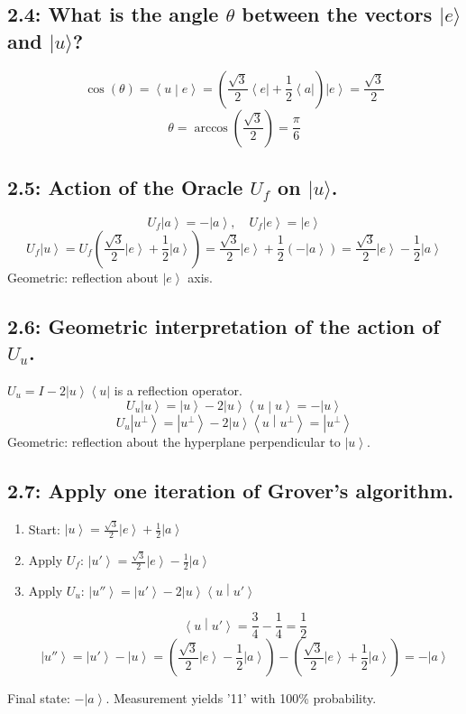 \documentclass[11pt]{article}
\newcommand{\ket}[1]{\left|{#1}\right\rangle}
\newcommand{\bra}[1]{\left\langle{#1}\right|}
\newcommand{\braket}[2]{\left\langle{#1}\middle|{#2}\right\rangle}
\begin{document}
\subsection*{2.4: What is the angle $\theta$ between the vectors $|e\rangle$ and $|u\rangle$?}
$$
\cos(\theta) = \braket{u}{e} = \left(\frac{\sqrt{3}}{2}\bra{e} + \frac{1}{2}\bra{a}\right) \ket{e} = \frac{\sqrt{3}}{2}
$$
$$
\theta = \arccos\left(\frac{\sqrt{3}}{2}\right) = \frac{\pi}{6}
$$

\subsection*{2.5: Action of the Oracle $U_f$ on $|u\rangle$.}
$$ U_f\ket{a} = -\ket{a}, \quad U_f\ket{e} = \ket{e} $$
$$
U_f\ket{u} = U_f\left(\frac{\sqrt{3}}{2}\ket{e} + \frac{1}{2}\ket{a}\right) = \frac{\sqrt{3}}{2}\ket{e} + \frac{1}{2}(-\ket{a}) = \frac{\sqrt{3}}{2}\ket{e} - \frac{1}{2}\ket{a}
$$
Geometric: reflection about $\ket{e}$ axis.

\subsection*{2.6: Geometric interpretation of the action of $U_u$.}
$U_u = I - 2\ket{u}\bra{u}$ is a reflection operator.
$$
U_u\ket{u} = \ket{u} - 2\ket{u}\braket{u}{u} = -\ket{u}
$$
$$
U_u\ket{u^\perp} = \ket{u^\perp} - 2\ket{u}\braket{u}{u^\perp} = \ket{u^\perp}
$$
Geometric: reflection about the hyperplane perpendicular to $\ket{u}$.

\subsection*{2.7: Apply one iteration of Grover's algorithm.}
\begin{enumerate}
    \item Start: $\ket{u} = \frac{\sqrt{3}}{2}\ket{e} + \frac{1}{2}\ket{a}$
    \item Apply $U_f$: $\ket{u'} = \frac{\sqrt{3}}{2}\ket{e} - \frac{1}{2}\ket{a}$
    \item Apply $U_u$: $\ket{u''} = \ket{u'} - 2\ket{u}\braket{u}{u'}$
    
    $$ \braket{u}{u'} = \frac{3}{4} - \frac{1}{4} = \frac{1}{2} $$
    $$ \ket{u''} = \ket{u'} - \ket{u} = \left(\frac{\sqrt{3}}{2}\ket{e} - \frac{1}{2}\ket{a}\right) - \left(\frac{\sqrt{3}}{2}\ket{e} + \frac{1}{2}\ket{a}\right) = -\ket{a} $$
\end{enumerate}
Final state: $-\ket{a}$. Measurement yields '11' with 100\% probability.
\end{document}
